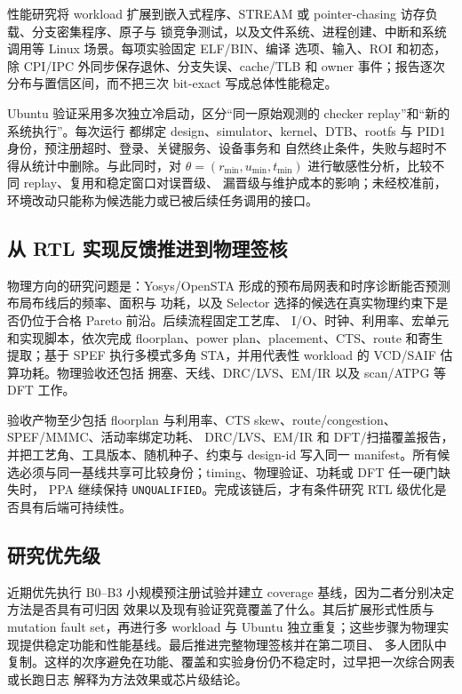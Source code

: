 \documentclass[UTF8,a4paper,zihao=-4,oneside]{ctexart}
\newcommand{\statusword}[1]{\texttt{#1}}
\begin{document}
性能研究将 workload 扩展到嵌入式程序、STREAM 或 pointer-chasing 访存负载、分支密集程序、原子与
锁竞争测试，以及文件系统、进程创建、中断和系统调用等 Linux 场景。每项实验固定 ELF/BIN、编译
选项、输入、ROI 和初态，除 CPI/IPC 外同步保存退休、分支失误、cache/TLB 和 owner 事件；报告逐次
分布与置信区间，而不把三次 bit-exact 写成总体性能稳定。

Ubuntu 验证采用多次独立冷启动，区分“同一原始观测的 checker replay”和“新的系统执行”。每次运行
都绑定 design、simulator、kernel、DTB、rootfs 与 PID1 身份，预注册超时、登录、关键服务、设备事务和
自然终止条件，失败与超时不得从统计中删除。与此同时，对
$\theta=(r_{\min},u_{\min},t_{\min})$ 进行敏感性分析，比较不同 replay、复用和稳定窗口对误晋级、
漏晋级与维护成本的影响；未经校准前，环境改动只能称为候选能力或已被后续任务调用的接口。

\subsection{从 RTL 实现反馈推进到物理签核}

物理方向的研究问题是：Yosys/OpenSTA 形成的预布局网表和时序诊断能否预测布局布线后的频率、面积与
功耗，以及 Selector 选择的候选在真实物理约束下是否仍位于合格 Pareto 前沿。后续流程固定工艺库、
I/O、时钟、利用率、宏单元和实现脚本，依次完成 floorplan、power plan、placement、CTS、route 和寄生
提取；基于 SPEF 执行多模式多角 STA，并用代表性 workload 的 VCD/SAIF 估算功耗。物理验收还包括
拥塞、天线、DRC/LVS、EM/IR 以及 scan/ATPG 等 DFT 工作。

验收产物至少包括 floorplan 与利用率、CTS skew、route/congestion、SPEF/MMMC、活动率绑定功耗、
DRC/LVS、EM/IR 和 DFT/扫描覆盖报告，并把工艺角、工具版本、随机种子、约束与 design-id 写入同一
manifest。所有候选必须与同一基线共享可比较身份；timing、物理验证、功耗或 DFT 任一硬门缺失时，
PPA 继续保持 \statusword{UNQUALIFIED}。完成该链后，才有条件研究 RTL 级优化是否具有后端可持续性。

\subsection{研究优先级}

近期优先执行 B0--B3 小规模预注册试验并建立 coverage 基线，因为二者分别决定方法是否具有可归因
效果以及现有验证究竟覆盖了什么。其后扩展形式性质与 mutation fault set，再进行多 workload 与
Ubuntu 独立重复；这些步骤为物理实现提供稳定功能和性能基线。最后推进完整物理签核并在第二项目、
多人团队中复制。这样的次序避免在功能、覆盖和实验身份仍不稳定时，过早把一次综合网表或长跑日志
解释为方法效果或芯片级结论。
\end{document}
